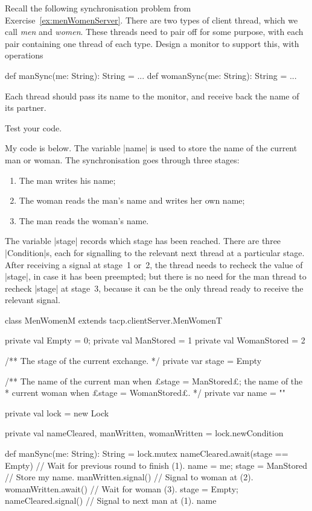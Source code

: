 \begin{question}
Recall the following synchronisation problem from
Exercise~\ref{ex:menWomenServer}.  There are two types of client thread, which
we  call \emph{men} and \emph{women}.  These threads need to pair off for
some purpose, with each pair containing one thread of each type.  Design a
monitor to support this, with operations
%
\begin{scala}
  def manSync(me: String): String = ...
  def womanSync(me: String): String = ...
\end{scala}
Each thread should pass its name to the monitor, and receive back the name of
its partner.

Test your code.
\end{question}


\begin{answerI}
My code is below.  The variable |name| is used to store the name of the
current man or woman.  The synchronisation goes through three stages:
\begin{enumerate}
\item[1.] The man writes his name;
\item[2.] The woman reads the man's name and writes her own name;
\item[3.] The man reads the woman's name.
\end{enumerate}
%
The variable |stage| records which stage has been reached.  There are three
|Condition|s, each for signalling to the relevant next thread at a particular
stage.  After receiving a signal at stage~1 or~2, the thread needs to recheck
the value of |stage|, in case it has been preempted; but there is no need for
the man thread to recheck |stage| at stage~3, because it can be the only
thread ready to receive the relevant signal.
%
\begin{scala}
class MenWomenM extends tacp.clientServer.MenWomenT{
  private val Empty = 0; private val ManStored = 1
  private val WomanStored = 2

  /** The stage of the current exchange. */
  private var stage = Empty

  /** The name of the current man when £stage = ManStored£; the name of the
    * current woman when £stage = WomanStored£. */
  private var name = ""

  private val lock = new Lock

  private val nameCleared, manWritten, womanWritten = lock.newCondition

  def manSync(me: String): String = lock.mutex{
    nameCleared.await(stage == Empty) // Wait for previous round to finish (1).
    name = me; stage = ManStored // Store my name.
    manWritten.signal() // Signal to woman at (2).
    womanWritten.await() // Wait for woman (3).
    stage = Empty; nameCleared.signal() // Signal to next man at (1).
    name
  }

}
\end{scala}
\end{answerI}
